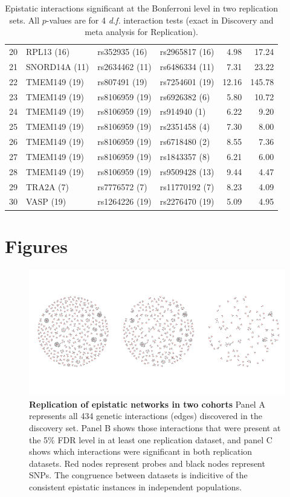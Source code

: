\documentclass{article}
\begin{document}
\begin{table}[ht]
\begin{tabular}{rlllrr}
  20 & RPL13 (16)  & rs352935 (16)  & rs2965817 (16)  & 4.98 & 17.24 \\
  21 & SNORD14A (11)  & rs2634462 (11)  & rs6486334 (11)  & 7.31 & 23.22 \\
  22 & TMEM149 (19)  & rs807491 (19)  & rs7254601 (19)  & 12.16 & 145.78 \\
  23 & TMEM149 (19)  & rs8106959 (19)  & rs6926382 (6)  & 5.80 & 10.72 \\
  24 & TMEM149 (19)  & rs8106959 (19)  & rs914940 (1)  & 6.22 & 9.20 \\
  25 & TMEM149 (19)  & rs8106959 (19)  & rs2351458 (4)  & 7.30 & 8.00 \\
  26 & TMEM149 (19)  & rs8106959 (19)  & rs6718480 (2)  & 8.55 & 7.36 \\
  27 & TMEM149 (19)  & rs8106959 (19)  & rs1843357 (8)  & 6.21 & 6.00 \\
  28 & TMEM149 (19)  & rs8106959 (19)  & rs9509428 (13)  & 9.44 & 4.47 \\
  29 & TRA2A (7)  & rs7776572 (7)  & rs11770192 (7)  & 8.23 & 4.09 \\
  30 & VASP (19)  & rs1264226 (19)  & rs2276470 (19)  & 5.09 & 4.95 \\
   \hline
\end{tabular}
\caption{Epistatic interactions significant at the Bonferroni level in two replication sets. All $p$-values are for 4 \emph{d.f.} interaction tests (exact in Discovery and meta analysis for Replication).}
\label{tab:bonferroni}
\end{table}


\clearpage
\section{Figures}

\begin{figure}[H]
	\centering
	\includegraphics[width=5in]{graph_of_interactions.pdf}
	\caption{\textbf{Replication of epistatic networks in two cohorts} Panel A represents all 434 genetic interactions (edges) discovered in the discovery set. Panel B shows those interactions that were present at the 5\% FDR level in at least one replication dataset, and panel C shows which interactions were significant in both replication datasets. Red nodes represent probes and black nodes represent SNPs. The congruence between datasets is indicitive of the consistent epistatic instances in independent populations.}
	\label{fig:fireworks}
\end{figure}
\clearpage
\end{document}
